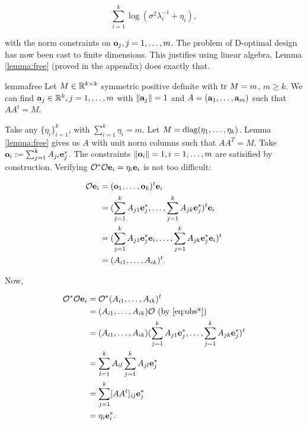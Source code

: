 \documentclass{amsart}
\numberwithin{equation}{section}
\begin{document}
\begin{equation}\label{eq:true target}
  \sum_{i=1}^{k}\log (\sigma^2 \lambda_i^{-1} + \eta_i),
\end{equation}

with the norm constraints on $\mathbf{o}_j,j=1,\dots,m$.
The problem of D-optimal design has now been cast to finite
dimensions. This justifies using linear algebra. Lemma
\ref{lemma:free} (proved in the appendix) does exactly that.
\begin{restatable*}{lemma}{free}\label{lemma:free}
  Let $M \in \mathbb{R}^{k \times k}$ symmetric positive definite with $\textup{tr}\ M
  = m$, $m \geq k$. We can find $\mathbf{a}_j \in \mathbb{R}^k,j=1,\dots,m$
  with $\|\mathbf{a}_j\|=1$ and $A = (\mathbf{a}_1,\dots,\mathbf{a}_m)$ such that
  $AA^t = M$.
\end{restatable*}

Take any $\{\eta_i\}_{i=1}^{k}$, with $\sum_{i=1}^k \eta_i = m$. Let
$M = \textup{diag}(\eta_1,\dots,\eta_k)$. Lemma \ref{lemma:free} gives us $A$
with unit norm columns such that $AA^T = M$. Take $\mathbf{o}_i
:=\sum_{j=1}^k A_{ji}\mathbf{e}_j^*$. The constraints $\|\mathbf{o}_i\| = 1,
i=1,\dots,m$ are satisified by construction. Verifying $\mathcal{O}^*\mathcal{O}
\mathbf{e}_i = \eta_i \mathbf{e}_i$ is not too difficult:

\begin{align*}
  \begin{split}
    \mathcal{O} \mathbf{e}_i &= (\mathbf{o}_1,\dots,\mathbf{o}_k)^t\mathbf{e}_i\\
    &= (\sum_{j=1}^kA_{j1}\mathbf{e}_j^*,\dots,\sum_{j=1}^kA_{jk}\mathbf{e}_j^*)^t\mathbf{e}_i\\
    &= (\sum_{j=1}^kA_{j1}\mathbf{e}_j^*\mathbf{e}_i,\dots,\sum_{j=1}^kA_{jk}\mathbf{e}_j^*\mathbf{e}_i)^t\\
    &= (A_{i1},\dots,A_{ik})^t.
  \end{split}
\end{align*}

Now, 

\begin{align*}
  \begin{split}
    \mathcal{O}^*\mathcal{O} \mathbf{e}_i &= \mathcal{O}^*(A_{i1},\dots,A_{ik})^t\\
    &=(A_{i1},\dots,A_{ik}) \mathcal{O} \text{ (by \eqref{eq:obs*})}\\
    &=(A_{i1},\dots,A_{ik}) (\sum_{j=1}^kA_{j1}\mathbf{e}_j^*,\dots,\sum_{j=1}^kA_{jk}\mathbf{e}_j^*)^t\\
    &=\sum_{l=1}^k A_{il} \sum_{j=1}^kA_{jl}\mathbf{e}_j^* \\
    &=\sum_{j=1}^k  [AA^t]_{ij}\mathbf{e}_j^* \\
    &=\eta_i\mathbf{e}_i^*. 
  \end{split}
\end{align*}
\end{document}
